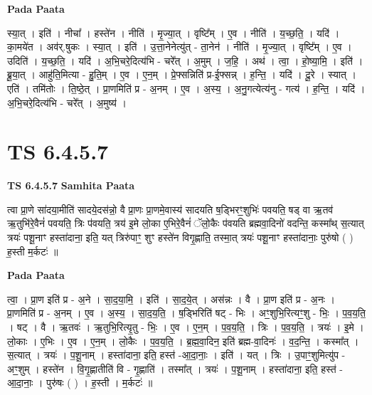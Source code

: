 \documentclass[17pt]{extarticle}
\begin{document}
\textbf{Pada Paata} \newline

स्या॒त् । इति॑ । नीचा᳚ । हस्ते॑न । नीति॑ । मृ॒ज्या॒त् । वृष्टि᳚म् । ए॒व । नीति॑ । य॒च्छ॒ति॒ । यदि॑ । का॒मये॑त । अव॑र्.षुकः । स्या॒त् । इति॑ । उ॒त्ता॒नेनेत्यु॑त् - ता॒नेन॑ । नीति॑ । मृ॒ज्या॒त् । वृष्टि᳚म् । ए॒व । उदिति॑ । य॒च्छ॒ति॒ । यदि॑ । अ॒भि॒चरे॒दित्य॑भि - चरे᳚त् । अ॒मुम् । ज॒हि॒ । अथ॑ । त्वा॒ । हो॒ष्या॒मि॒ । इति॑ । ब्रू॒या॒त् । आहु॑ति॒मित्या - हु॒ति॒म् । ए॒व । ए॒न॒म् । प्रे॒फ्सन्निति॑ प्र-ई॒फ्सन्न् । ह॒न्ति॒ । यदि॑ । दू॒रे । स्यात् । एति॑ । तमि॑तोः । ति॒ष्ठे॒त् । प्रा॒णमिति॑ प्र - अ॒नम् । ए॒व । अ॒स्य॒ । अ॒नु॒गत्येत्य॑नु - गत्य॑ । ह॒न्ति॒ । यदि॑ । अ॒भि॒चरे॒दित्य॑भि - चरे᳚त् । अ॒मुष्य॑ ।  \newline




\section*{ TS 6.4.5.7 }

\textbf{TS 6.4.5.7 } \newline
\textbf{Samhita Paata} \newline

त्वा प्रा॒णे सा॑दया॒मीति॑ सादये॒दस॑न्नो॒ वै प्रा॒णः प्रा॒णमे॒वास्य॑ सादयति ष॒ड्भिरꣳ॒॒शुभिः॑ पवयति॒ षड् वा ऋ॒तव॑ ऋ॒तुभि॑रे॒वैनं॑ पवयति॒ त्रिः प॑वयति॒ त्रय॑ इ॒मे लो॒का ए॒भिरे॒वैनं॑ ॅलो॒कैः प॑वयति ब्रह्मवा॒दिनो॑ वदन्ति॒ कस्मा᳚थ् स॒त्यात् त्रयः॑ पशू॒नाꣳ हस्ता॑दाना॒ इति॒ यत् त्रिरु॑पाꣳ॒॒ शुꣳ हस्ते॑न विगृ॒ह्णाति॒ तस्मा॒त् त्रयः॑ पशू॒नाꣳ हस्ता॑दानाः॒ पुरु॑षो ( ) ह॒स्ती म॒र्कटः॑ ॥ \newline

\textbf{Pada Paata} \newline

त्वा॒ । प्रा॒ण इति॑ प्र - अ॒ने । सा॒द॒या॒मि॒ । इति॑ । सा॒द॒ये॒त् । अस॑न्नः । वै । प्रा॒ण इति॑ प्र - अ॒नः । प्रा॒णमिति॑ प्र - अ॒नम् । ए॒व । अ॒स्य॒ । सा॒द॒य॒ति॒ । ष॒ड्भिरिति॑ षट् - भिः । अꣳ॒॒शुभि॒रित्यꣳ॒॒शु - भिः॒ । प॒व॒य॒ति॒ । षट् । वै । ऋ॒तवः॑ । ऋ॒तुभि॒रित्यृ॒तु - भिः॒ । ए॒व । ए॒न॒म् । प॒व॒य॒ति॒ । त्रिः । प॒व॒य॒ति॒ । त्रयः॑ । इ॒मे । लो॒काः । ए॒भिः । ए॒व । ए॒न॒म् । लो॒कैः । प॒व॒य॒ति॒ । ब्र॒ह्म॒वा॒दिन॒ इति॑ ब्रह्म-वा॒दिनः॑ । व॒द॒न्ति॒ । कस्मा᳚त् । स॒त्यात् । त्रयः॑ । प॒शू॒नाम् । हस्ता॑दाना॒ इति॒ हस्त॑ -आ॒दा॒नाः॒ । इति॑ । यत् । त्रिः । उ॒पाꣳ॒॒शुमित्यु॑प - अꣳ॒॒शुम् । हस्ते॑न । वि॒गृ॒ह्णातीति॑ वि - गृ॒ह्णाति॑ । तस्मा᳚त् । त्रयः॑ । प॒शू॒नाम् । हस्ता॑दाना॒ इति॒ हस्त॑ - आ॒दा॒नाः॒ । पुरु॑षः ( ) । ह॒स्ती । म॒र्कटः॑ ॥  \newline
\end{document}
